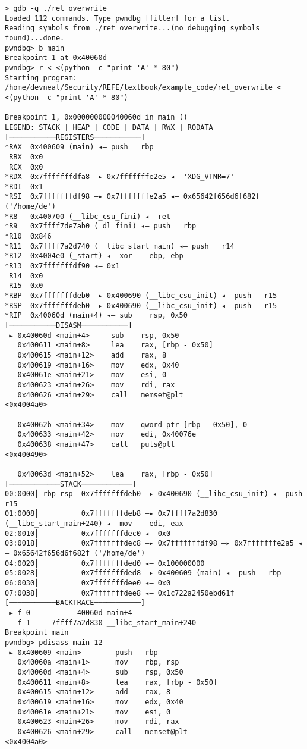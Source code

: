 \documentclass{article}
\begin{document}
\begin{lstlisting}
> gdb -q ./ret_overwrite 
Loaded 112 commands. Type pwndbg [filter] for a list.
Reading symbols from ./ret_overwrite...(no debugging symbols found)...done.
pwndbg> b main
Breakpoint 1 at 0x40060d
pwndbg> r < <(python -c "print 'A' * 80")
Starting program: /home/devneal/Security/REFE/textbook/example_code/ret_overwrite < <(python -c "print 'A' * 80")

Breakpoint 1, 0x000000000040060d in main ()
LEGEND: STACK | HEAP | CODE | DATA | RWX | RODATA
[───────────REGISTERS───────────]
*RAX  0x400609 (main) ◂— push   rbp
 RBX  0x0
 RCX  0x0
*RDX  0x7fffffffdfa8 —▸ 0x7fffffffe2e5 ◂— 'XDG_VTNR=7'
*RDI  0x1
*RSI  0x7fffffffdf98 —▸ 0x7fffffffe2a5 ◂— 0x65642f656d6f682f ('/home/de')
*R8   0x400700 (__libc_csu_fini) ◂— ret    
*R9   0x7ffff7de7ab0 (_dl_fini) ◂— push   rbp
*R10  0x846
*R11  0x7ffff7a2d740 (__libc_start_main) ◂— push   r14
*R12  0x4004e0 (_start) ◂— xor    ebp, ebp
*R13  0x7fffffffdf90 ◂— 0x1
 R14  0x0
 R15  0x0
*RBP  0x7fffffffdeb0 —▸ 0x400690 (__libc_csu_init) ◂— push   r15
*RSP  0x7fffffffdeb0 —▸ 0x400690 (__libc_csu_init) ◂— push   r15
*RIP  0x40060d (main+4) ◂— sub    rsp, 0x50
[───────────DISASM───────────]
 ► 0x40060d <main+4>     sub    rsp, 0x50
   0x400611 <main+8>     lea    rax, [rbp - 0x50]
   0x400615 <main+12>    add    rax, 8
   0x400619 <main+16>    mov    edx, 0x40
   0x40061e <main+21>    mov    esi, 0
   0x400623 <main+26>    mov    rdi, rax
   0x400626 <main+29>    call   memset@plt                    <0x4004a0>
 
   0x40062b <main+34>    mov    qword ptr [rbp - 0x50], 0
   0x400633 <main+42>    mov    edi, 0x40076e
   0x400638 <main+47>    call   puts@plt                      <0x400490>
 
   0x40063d <main+52>    lea    rax, [rbp - 0x50]
[────────────STACK────────────]
00:0000│ rbp rsp  0x7fffffffdeb0 —▸ 0x400690 (__libc_csu_init) ◂— push   r15
01:0008│          0x7fffffffdeb8 —▸ 0x7ffff7a2d830 (__libc_start_main+240) ◂— mov    edi, eax
02:0010│          0x7fffffffdec0 ◂— 0x0
03:0018│          0x7fffffffdec8 —▸ 0x7fffffffdf98 —▸ 0x7fffffffe2a5 ◂— 0x65642f656d6f682f ('/home/de')
04:0020│          0x7fffffffded0 ◂— 0x100000000
05:0028│          0x7fffffffded8 —▸ 0x400609 (main) ◂— push   rbp
06:0030│          0x7fffffffdee0 ◂— 0x0
07:0038│          0x7fffffffdee8 ◂— 0x1c722a2450ebd61f
[───────────BACKTRACE───────────]
 ► f 0           40060d main+4
   f 1     7ffff7a2d830 __libc_start_main+240
Breakpoint main
pwndbg> pdisass main 12
 ► 0x400609 <main>        push   rbp
   0x40060a <main+1>      mov    rbp, rsp
   0x40060d <main+4>      sub    rsp, 0x50
   0x400611 <main+8>      lea    rax, [rbp - 0x50]
   0x400615 <main+12>     add    rax, 8
   0x400619 <main+16>     mov    edx, 0x40
   0x40061e <main+21>     mov    esi, 0
   0x400623 <main+26>     mov    rdi, rax
   0x400626 <main+29>     call   memset@plt                    <0x4004a0>
 

\end{lstlisting}
\end{document}
